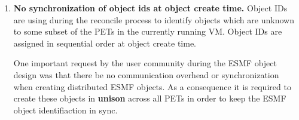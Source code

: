 %



\begin{enumerate}

\item{\bf No synchronization of object ids at object create time.}
Object IDs are using during the reconcile process to identify objects
which are unknown to some subset of the PETs in the currently running VM.
Object IDs are assigned in sequential order at object create time.

One important request by the user community during the ESMF object design was
that there be no communication overhead or synchronization when creating
distributed ESMF objects. As a consequence it is required to create these
objects in {\bf unison} across all PETs in order to keep the ESMF object
identifiaction in sync.

\end{enumerate}



